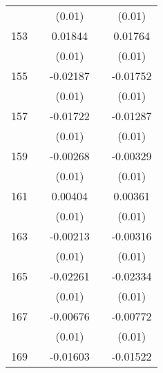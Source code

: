 \begin{table}[htbp]
\begin{tabular}{l*{4}{c}}
                    &                     &      (0.01)         &                     &      (0.01)         \\
153                 &                     &     0.01844         &                     &     0.01764         \\
                    &                     &      (0.01)         &                     &      (0.01)         \\
155                 &                     &    -0.02187         &                     &    -0.01752         \\
                    &                     &      (0.01)         &                     &      (0.01)         \\
157                 &                     &    -0.01722\sym{**} &                     &    -0.01287\sym{*}  \\
                    &                     &      (0.01)         &                     &      (0.01)         \\
159                 &                     &    -0.00268         &                     &    -0.00329         \\
                    &                     &      (0.01)         &                     &      (0.01)         \\
161                 &                     &     0.00404         &                     &     0.00361         \\
                    &                     &      (0.01)         &                     &      (0.01)         \\
163                 &                     &    -0.00213         &                     &    -0.00316         \\
                    &                     &      (0.01)         &                     &      (0.01)         \\
165                 &                     &    -0.02261         &                     &    -0.02334         \\
                    &                     &      (0.01)         &                     &      (0.01)         \\
167                 &                     &    -0.00676         &                     &    -0.00772         \\
                    &                     &      (0.01)         &                     &      (0.01)         \\
169                 &                     &    -0.01603\sym{*}  &                     &    -0.01522         \\

\end{tabular}
\end{table}
